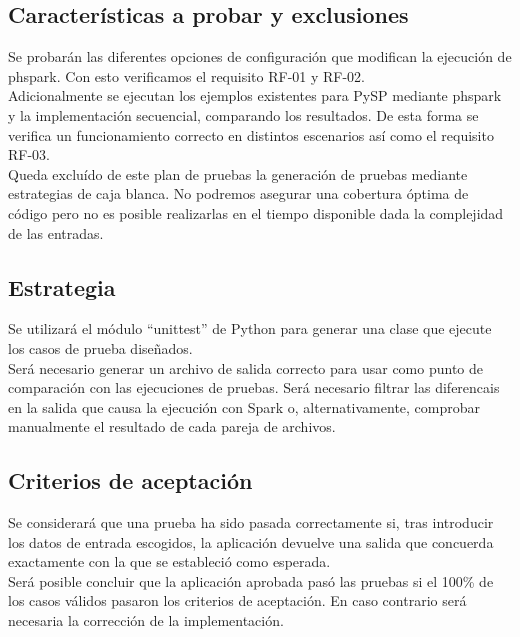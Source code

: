 \subsection{Características a probar y exclusiones}

Se probarán las diferentes opciones de configuración que modifican la ejecución de phspark. Con esto verificamos el requisito RF-01 y RF-02.\\

Adicionalmente se ejecutan los ejemplos existentes para PySP mediante phspark y la implementación secuencial, comparando los resultados. De esta forma se verifica un funcionamiento correcto en distintos escenarios así como el requisito RF-03.\\

Queda excluído de este plan de pruebas la generación de pruebas mediante estrategias de caja blanca. No podremos asegurar una cobertura óptima de código pero no es posible realizarlas en el tiempo disponible dada la complejidad de las entradas.

\subsection{Estrategia}

Se utilizará el módulo ``unittest'' de Python para generar una clase que ejecute los casos de prueba diseñados.\\

Será necesario generar un archivo de salida correcto para usar como punto de comparación con las ejecuciones de pruebas. Será necesario filtrar las diferencais en la salida que causa la ejecución con Spark o, alternativamente, comprobar manualmente el resultado de cada pareja de archivos.

\subsection{Criterios de aceptación}

Se considerará que una prueba ha sido pasada correctamente si, tras introducir los datos de entrada escogidos, la aplicación devuelve una salida que concuerda exactamente con la que se estableció como esperada.\\

Será posible concluir que la aplicación aprobada pasó las pruebas si el 100\% de los casos válidos pasaron los criterios de aceptación. En caso contrario será necesaria la corrección de la implementación.

